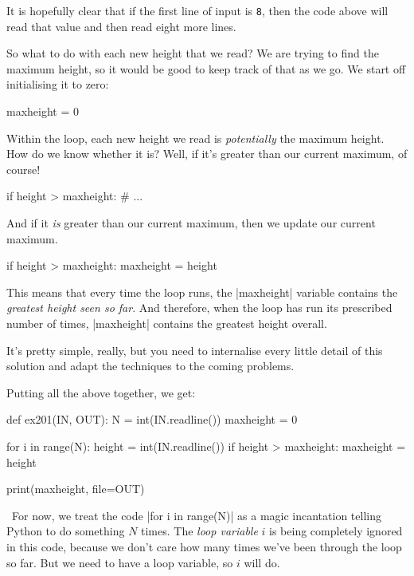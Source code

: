 It is hopefully clear that if the first line of input is \texttt{8}, then the code above
will read that value and then read eight more lines.

So what to do with each new height that we read? We are trying to find the maximum height,
so it would be good to keep track of that as we go. We start off initialising it to zero:
\begin{pythoncode}
  maxheight = 0
\end{pythoncode}

Within the loop, each new height we read is \emph{potentially} the maximum height. How do
we know whether it is? Well, if it's greater than our current maximum, of course!
\begin{pythoncode}
  if height > maxheight:
    # ...
\end{pythoncode}

And if it \emph{is} greater than our current maximum, then we update our current maximum.
\begin{pythoncode}
  if height > maxheight:
    maxheight = height
\end{pythoncode}

This means that every time the loop runs, the \pycode|maxheight| variable contains the
\emph{greatest height seen so far}. And therefore, when the loop has run its prescribed
number of times, \pycode|maxheight| contains the greatest height overall.

It's pretty simple, really, but you need to internalise every little detail of this
solution and adapt the techniques to the coming problems.

\Solution

Putting all the above together, we get:

\begin{pythoncode} 
  def ex201(IN, OUT):
    N = int(IN.readline())
    maxheight = 0

    for i in range(N):
      height = int(IN.readline())
      if height > maxheight:
        maxheight = height

    print(maxheight, file=OUT)
\end{pythoncode}

\Notes\ For now, we treat the code \pycode|for i in range(N)| as a magic incantation
telling Python to do something $N$ times. The \emph{loop variable} $i$ is being completely
ignored in this code, because we don't care how many times we've been through the loop so
far. But we need to have a loop variable, so $i$ will do.

